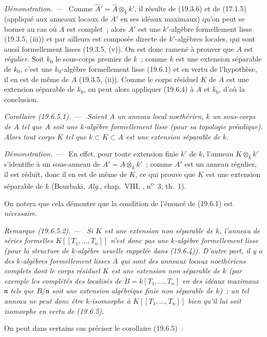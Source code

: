 \documentclass[10pt,oneside]{book}
\makeatletter
\newcommand{\setmanualcurrentlabel}[1]{\def\@currentlabel{#1}}
\newcommand{\oldpage}[2][]{%
  \setcounter{footnote}{0}%
  \marginpar{\scriptsize\textbf{#1}~|~#2}\ignorespaces}
\newenvironment{corollary}[1][]{%
  \setmanualcurrentlabel{#1}\par\medskip\noindent\itshape Corollaire (#1). ---\ }{\par}
\newenvironment{remark}[1][]{%
  \setmanualcurrentlabel{#1}\par\medskip\noindent\itshape Remarque (#1). ---\ }{\par}
\newenvironment{proof}{%
  \par\medskip\noindent\textit{Démonstration. ---\ }}{\par}
\makeatother
\begin{document}
\begin{proof}
Comme $\widehat A'=\widehat A\otimes_k k'$, il résulte de (19.3.6) et de
(17.1.5) (appliqué aux anneaux locaux de $A'$ en ses idéaux maximaux) qu'on
peut se borner au cas où $A$ est complet~; alors $A'$ est une $k'$-algèbre
formellement lisse (19.3.5, (iii)) et par ailleurs est composée directe de
$k'$-algèbres locales, qui sont aussi formellement lisses (19.3.5, (v)). On est
donc ramené à prouver que $A$ est \emph{régulier}. Soit $k_0$ le sous-corps
premier de $k$~; comme $k$ est une extension séparable de $k_0$, c'est une
$k_0$-algèbre formellement lisse (19.6.1) et en vertu de l'hypothèse, il en est
de même de $A$ (19.3.5, (ii)). Comme le corps résiduel $K$ de $A$ est une
extension séparable de $k_0$, on peut alors appliquer (19.6.4) à $A$ et $k_0$,
d'où la conclusion.
\end{proof}

\oldpage[0\textsubscript{IV-1}]{103}

\begin{corollary}[19.6.5.1]
\label{0.19.6.5.1-fr}
Soient $A$ un anneau local noethérien, $k$ un sous-corps de $A$ tel que $A$
soit une $k$-algèbre formellement lisse (pour sa topologie préadique). Alors
tout corps $K$ tel que $k\subset K\subset A$ est une extension séparable de
$k$.
\end{corollary}

\begin{proof}
En effet, pour toute extension finie $k'$ de $k$, l'anneau $K\otimes_k k'$ 
s'identifie à un sous-anneau de $A'=A\otimes_k k'$~; comme $A'$ est un anneau
régulier, il est réduit, donc il en est de même de $K$, ce qui prouve que $K$
est une extension séparable de $k$ (Bourbaki, \emph{Alg.}, chap.~VIII,
, n\textsuperscript{o}~3, th.~1).
\end{proof}

On notera que cela démontre que la condition de l'énoncé de (19.6.1) est
\emph{nécessaire}.

\begin{remark}[19.6.5.2]
\label{0.19.6.5.2-fr}
Si $K$ est une extension \emph{non séparable} de $k$, l'anneau de séries
formelles $K[[T_1,\ldots,T_n]]$ \emph{n'est donc pas} une $k$-algèbre
formellement lisse (pour la structure de $k$-algèbre usuelle rappelée dans
(19.6.4)). D'autre part, il y a des $k$-algèbres formellement lisses $A$ qui
sont des anneaux locaux noethériens complets dont le corps résiduel $K$ est une
extension \emph{non séparable} de $k$ (par exemple les complétés des localisés
de $B=k[T_1,\ldots,T_n]$ en des idéaux maximaux $\mathfrak n$ tels que
$B/\mathfrak n$ soit une extension algébrique finie non séparable de $k$)~; un
tel anneau ne peut donc être $k$-isomorphe à $K[[T_1,\ldots,T_n]]$ bien qu'il
lui soit isomorphe en vertu de (19.6.5).

On peut dans certains cas préciser le corollaire (19.6.5)~:
\end{remark}
\end{document}
